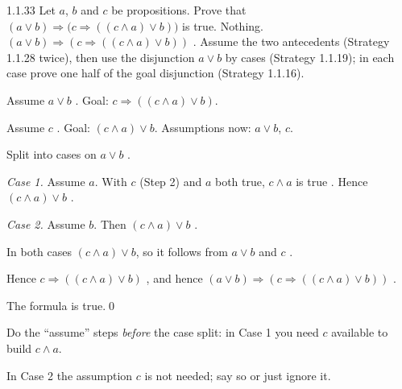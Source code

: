 \begin{bookex}[essential]{1.1.33}
Let $a$, $b$ and $c$ be propositions. Prove that $(a\vee b)\Rightarrow\big(c\Rightarrow((c\wedge a)\vee b)\big)$ is true.
\solution
\given Nothing.
\goal $(a\vee b)\Rightarrow(c\Rightarrow((c\wedge a)\vee b))$ .
\plan Assume the two antecedents (Strategy 1.1.28 twice), then use the disjunction $a\vee b$ by cases (Strategy 1.1.19); in each case prove one half of the goal disjunction (Strategy 1.1.16).
\begin{steps}
\item Assume $a\vee b$ . Goal: $c\Rightarrow((c\wedge a)\vee b)$.
\item Assume $c$ . Goal: $(c\wedge a)\vee b$. Assumptions now: $a\vee b$, $c$.
\item Split into cases on $a\vee b$ .
\item \emph{Case 1.} Assume $a$. With $c$ (Step 2) and $a$ both true, $c\wedge a$ is true . Hence $(c\wedge a)\vee b$ .
\item \emph{Case 2.} Assume $b$. Then $(c\wedge a)\vee b$ .
\item In both cases $(c\wedge a)\vee b$, so it follows from $a\vee b$ and $c$ .
\item Hence $c\Rightarrow((c\wedge a)\vee b)$ , and hence $(a\vee b)\Rightarrow(c\Rightarrow((c\wedge a)\vee b))$ .
\end{steps}
\conclusion The formula is true.\qed
\begin{compare}
\item Do the ``assume'' steps \emph{before} the case split: in Case 1 you need $c$ available to build $c\wedge a$.
\item In Case 2 the assumption $c$ is not needed; say so or just ignore it.
\end{compare}
\end{bookex}

